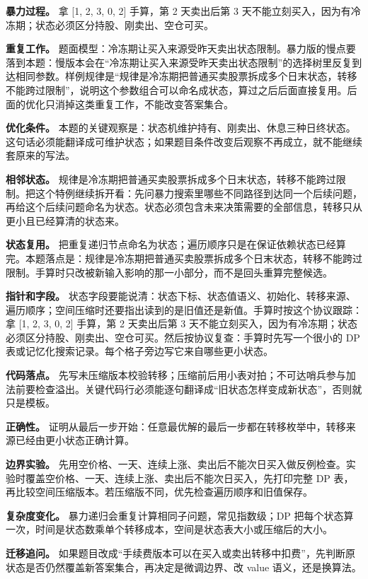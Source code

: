 \textbf{暴力过程。} 拿 [1, 2, 3, 0, 2] 手算，第 2 天卖出后第 3 天不能立刻买入，因为有冷冻期；状态必须区分持股、刚卖出、空仓可买。

\textbf{重复工作。} 题面模型：冷冻期让买入来源受昨天卖出状态限制。暴力版的慢点要落到本题：慢版本会在“冷冻期让买入来源受昨天卖出状态限制”的选择树里反复到达相同参数。样例规律是“规律是冷冻期把普通买卖股票拆成多个日末状态，转移不能跨过限制”，说明这个参数组合可以命名成状态，算过之后后面直接复用。后面的优化只消掉这类重复工作，不能改变答案集合。

\textbf{优化条件。} 本题的关键观察是：状态机维护持有、刚卖出、休息三种日终状态。这句话必须能翻译成可维护状态；如果题目条件改变后观察不再成立，就不能继续套原来的写法。

\textbf{相邻状态。} 规律是冷冻期把普通买卖股票拆成多个日末状态，转移不能跨过限制。把这个特例继续拆开看：先问暴力搜索里哪些不同路径到达同一个后续问题，再给这个后续问题命名为状态。状态必须包含未来决策需要的全部信息，转移只从更小且已经算清的状态来。

\textbf{状态复用。} 把重复递归节点命名为状态；遍历顺序只是在保证依赖状态已经算完。本题落点是：规律是冷冻期把普通买卖股票拆成多个日末状态，转移不能跨过限制。手算时只改被新输入影响的那一小部分，而不是回头重算完整候选。

\textbf{指针和字段。} 状态字段要能说清：状态下标、状态值语义、初始化、转移来源、遍历顺序；空间压缩时还要指出读到的是旧值还是新值。手算时按这个协议跟踪：拿 [1, 2, 3, 0, 2] 手算，第 2 天卖出后第 3 天不能立刻买入，因为有冷冻期；状态必须区分持股、刚卖出、空仓可买。然后按协议复查：手算时先写一个很小的 DP 表或记忆化搜索记录。每个格子旁边写它来自哪些更小状态。

\textbf{代码落点。} 先写未压缩版本校验转移；压缩前后用小表对拍；不可达哨兵参与加法前要检查溢出。关键代码行必须能逐句翻译成“旧状态怎样变成新状态”，否则就只是模板。

\textbf{正确性。} 证明从最后一步开始：任意最优解的最后一步都在转移枚举中，转移来源已经由更小状态正确计算。

\textbf{边界实验。} 先用空价格、一天、连续上涨、卖出后不能次日买入做反例检查。实验时覆盖空价格、一天、连续上涨、卖出后不能次日买入，先打印完整 DP 表，再比较空间压缩版本。若压缩版不同，优先检查遍历顺序和旧值保存。

\textbf{复杂度变化。} 暴力递归会重复计算相同子问题，常见指数级；DP 把每个状态算一次，时间是状态数乘单个转移成本，空间是状态表大小或压缩后的大小。

\textbf{迁移追问。} 如果题目改成“手续费版本可以在买入或卖出转移中扣费”，先判断原状态是否仍然覆盖新答案集合，再决定是微调边界、改 value 语义，还是换算法。

